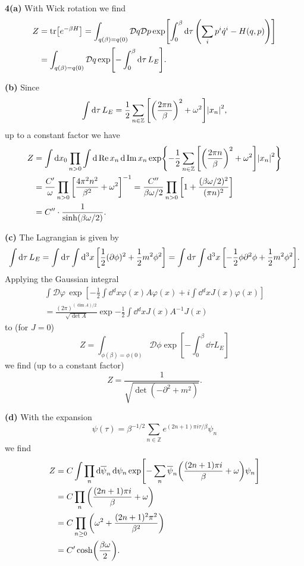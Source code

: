 \documentclass{article}
\makeatletter
\newcommand*{\shifttext}[1]{%
  \settowidth{\@tempdima}{#1}%
  \hspace{-\@tempdima}#1%
}
\newcommand{\plabel}[1]{%
\shifttext{\textbf{#1}\quad}%
}
\newcommand{\prule}{%
\begin{center}%
\hdashrule[0.5ex]{.99\linewidth}{1pt}{1pt 2.5pt}%
\end{center}%
}
\makeatother
\begin{document}
\prule

\plabel{4(a)}%
With Wick rotation we find
\begin{align*}
    Z &= \tr[e^{-\beta H}] = \int_{q(\beta) = q(0)} \mathcal{D}q \mathcal{D}p \exp[\int_0^\beta \dd{\tau} \qty(\sum_i p^i \dot{q}^i - H(q,p))] \\
    &= \int_{q(\beta) = q(0)} \mathcal{D}q \exp[-\int_0^\beta \dd{\tau} L_E].
\end{align*}

\plabel{(b)}%
Since
\[ \int \dd{\tau} L_E = \frac{1}{2} \sum_{n\in\mathbb{Z}} \qty[\qty(\frac{2\pi n}{\beta})^2 + \omega^2] \abs{x_n}^2, \]
up to a constant factor we have
\begin{align*}
    Z &= \int \dd{x_0} \prod_{n>0} \int \dd{\Re x_n} \dd{\Im x_n} \exp{-\frac{1}{2} \sum_{n\in\mathbb{Z}}\qty[\qty(\frac{2\pi n}{\beta})^2 + \omega^2] \abs{x_n}^2} \\
    &= \frac{C'}{\omega} \prod_{n>0} \qty[\frac{4\pi^2 n^2}{\beta^2} + \omega^2]^{-1} = \frac{C''}{\beta\omega/2} \prod_{n>0} \qty[1 + \frac{(\beta\omega/2)^2}{(\pi n)^2}] \\
    &= C'' \cdot \frac{1}{\sinh(\beta\omega/2)}.
\end{align*}

\plabel{(c)}%
The Lagrangian is given by
\[ \int \dd{\tau} L_E = \int \dd{\tau} \int \dd[3]{x} \qty[\frac{1}{2} (\partial \phi)^2 + \frac{1}{2} m^2 \phi^2] = \int \dd{\tau} \int \dd[3]{x} \qty[-\frac{1}{2} \phi \partial^2 \phi + \frac{1}{2} m^2 \phi^2]. \]
Applying the Gaussian integral
\begin{gather*}
    \int \mathcal{D}\varphi\, \exp[-\frac{1}{2}\int \dd{^d x} \varphi(x) A\varphi(x) + i \int \dd{^d x} J(x)\varphi(x)] \\
    = \frac{(2\pi)^{(\dim A)/2}}{\sqrt{\det A}} \exp{-\frac{1}{2}\int \dd{^d x} J(x) A^{-1}J(x)}
\end{gather*}
to (for $J=0$)
\[ Z = \int_{\phi(\beta) = \phi(0)} \mathcal{D}\phi \exp[-\int_0^\beta \dd{\tau} L_E] \]
we find (up to a constant factor)
\[ Z = \frac{1}{\sqrt{\det(-\partial^2 + m^2)}}. \]

\plabel{(d)}%
With the expansion
\[ \psi(\tau) = \beta^{-1/2} \sum_{n\in \mathbb{Z}} e^{(2n+1)\pi i\tau/\beta} \psi_n \]
we find
\begin{align*}
    Z &= C\int \prod_n \dd{\overline{\psi}_n}\dd{\psi_n} \exp[- \sum_n \overline{\psi}_n \qty(\frac{(2n+1)\pi i}{\beta} + \omega) \psi_n] \\
    &= C \prod_{n} \qty(\frac{(2n+1)\pi i}{\beta} + \omega) \\
    &= C \prod_{n\ge 0} \qty(\omega^2 + \frac{(2n+1)^2 \pi^2}{\beta^2}) \\
    &= C' \cosh(\frac{\beta\omega}{2}).
\end{align*}
\end{document}

